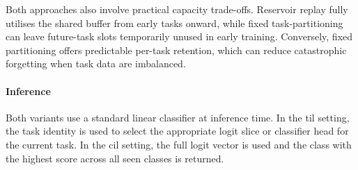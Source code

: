 Both approaches also involve practical capacity trade-offs. Reservoir replay fully utilises the shared buffer from early tasks onward, while fixed task-partitioning can leave future-task slots temporarily unused in early training. Conversely, fixed partitioning offers predictable per-task retention, which can reduce catastrophic forgetting when task data are imbalanced.

\paragraph{Inference}

Both variants use a standard linear classifier at inference time. In the \gls{til} setting, the task identity is used to select the appropriate logit slice or classifier head for the current task. In the \gls{cil} setting, the full logit vector is used and the class with the highest score across all seen classes is returned.